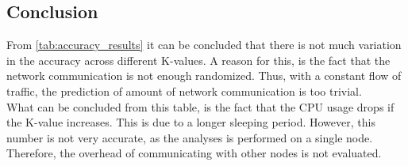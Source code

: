 \subsection{Conclusion}
From \autoref{tab:accuracy_results} it can be concluded that there is not much variation in the accuracy across different K-values. A reason for this, is the fact that the network communication is not enough randomized. Thus, with a constant flow of traffic, the prediction of amount of network communication is too trivial.\\

\noindent
What can be concluded from this table, is the fact that the CPU usage drops if the K-value increases. This is due to a longer sleeping period. However, this number is not very accurate, as the analyses is performed on a single node. Therefore, the overhead of communicating with other nodes is not evaluated.